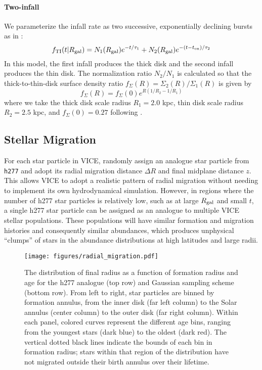 \documentclass[twocolumn,linenumbers,twocolappendix]{aastex631}
\begin{document}
\paragraph{Two-infall} 
We parameterize the infall rate as two successive, exponentially declining bursts as in \citet{Chiappini2001-AbundanceGradients}:
\begin{equation}
    \label{eq:twoinfall-ifr}
    f_{\rm TI}(t|R_{\rm gal}) = N_1(R_{\rm gal}) e^{-t/\tau_1} + N_2(R_{\rm gal}) e^{-(t-t_{\rm on})/\tau_2}
\end{equation}
In this model, the first infall produces the thick disk and the second infall produces the thin disk. The normalization ratio $N_2/N_1$ is calculated so that the thick-to-thin-disk surface density ratio $f_\Sigma(R)=\Sigma_2(R)/\Sigma_1(R)$ is given by
\begin{equation}
    f_\Sigma(R) = f_\Sigma(0) e^{R(1/R_2 - 1/R_1)}
\end{equation}
where we take the thick disk scale radius $R_1=2.0$ kpc, thin disk scale radius $R_2=2.5$ kpc, and $f_\Sigma(0)=0.27$ following \citet{BlandHawthornGerhard2016-MilkyWayReview}.

\subsection{Stellar Migration}
\label{sec:migration}

For each star particle in VICE, \citet{Johnson2021-Migration} randomly assign an analogue star particle from \texttt{h277} and adopt its radial migration distance $\Delta R$ and final midplane distance $z$. This allows VICE to adopt a realistic pattern of radial migration without needing to implement its own hydrodynamical simulation. However, in regions where the number of h277 star particles is relatively low, such as at large $R_{\rm gal}$ and small $t$, a single h277 star particle can be assigned as an analogue to multiple VICE stellar populations. These populations will have similar formation and migration histories and consequently similar abundances, which produces unphysical ``clumps'' of stars in the abundance distributions at high latitudes and large radii. 

\begin{figure*}
    \centering
    \texttt{[image: figures/radial\_migration.pdf]}
    \caption{The distribution of final radius as a function of formation radius and age for the h277 analogue (top row) and Gaussian sampling scheme (bottom row). From left to right, star particles are binned by formation annulus, from the inner disk (far left column) to the Solar annulus (center column) to the outer disk (far right column). Within each panel, colored curves represent the different age bins, ranging from the youngest stars (dark blue) to the oldest (dark red). The vertical dotted black lines indicate the bounds of each bin in formation radius; stars within that region of the distribution have not migrated outside their birth annulus over their lifetime.}
    \label{fig:radial-migration}
\end{figure*}
\end{document}

